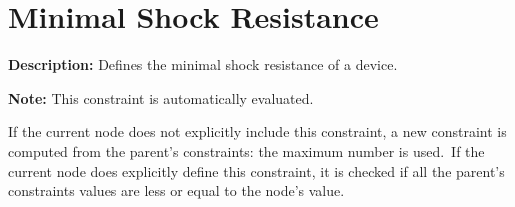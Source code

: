 \section{Minimal Shock Resistance}\label{CONSTRAINTMinShockResistance}
\textbf{Description:} Defines the minimal shock resistance of a device.

\textbf{Note:} This constraint is automatically evaluated.\par If the current node does not explicitly include this constraint, a new constraint is computed from the parent's constraints: the maximum number is used.\ If the current node does explicitly define this constraint, it is checked if all the parent's constraints values are less or equal to the node's value.
